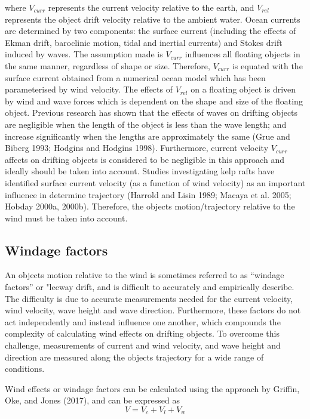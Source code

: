 \documentclass[
]{article}
\begin{document}
where \(V_{curr}\) represents the current velocity relative to the
earth, and \(V_{rel}\) represents the object drift velocity relative to
the ambient water. Ocean currents are determined by two components: the
surface current (including the effects of Ekman drift, baroclinic
motion, tidal and inertial currents) and Stokes drift induced by waves.
The assumption made is \(V_{curr}\) influences all floating objects in
the same manner, regardless of shape or size. Therefore, \(V_{curr}\) is
equated with the surface current obtained from a numerical ocean model
which has been parameterised by wind velocity. The effects of
\(V_{rel}\) on a floating object is driven by wind and wave forces which
is dependent on the shape and size of the floating object. Previous
research has shown that the effects of waves on drifting objects are
negligible when the length of the object is less than the wave length;
and increase significantly when the lengths are approximately the same
(Grue and Biberg 1993; Hodgins and Hodgins 1998). Furthermore, current
velocity \(V_{curr}\) affects on drifting objects is considered to be
negligible in this approach and ideally should be taken into account.
Studies investigating kelp rafts have identified surface current
velocity (as a function of wind velocity) as an important influence in
determine trajectory (Harrold and Lisin 1989; Macaya et al. 2005; Hobday
2000a, 2000b). Therefore, the objects motion/trajectory relative to the
wind must be taken into account.

\hypertarget{windage-factors}{%
\subsection{Windage factors}\label{windage-factors}}

An objects motion relative to the wind is sometimes referred to as
``windage factors'' or "leeway drift, and is difficult to accurately and
empirically describe. The difficulty is due to accurate measurements
needed for the current velocity, wind velocity, wave height and wave
direction. Furthermore, these factors do not act independently and
instead influence one another, which compounds the complexity of
calculating wind effects on drifting objects. To overcome this
challenge, measurements of current and wind velocity, and wave height
and direction are measured along the objects trajectory for a wide range
of conditions.

Wind effects or windage factors can be calculated using the approach by
Griffin, Oke, and Jones (2017), and can be expressed as
\[V = V_c + V_l + V_w\]
\end{document}
